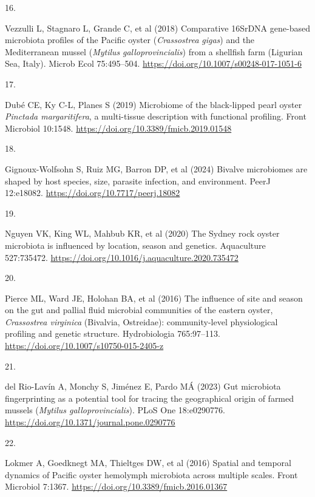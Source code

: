 \documentclass[
  12 pt,
]{article}
\newlength{\cslhangindent}
\newlength{\csllabelwidth}
\newenvironment{CSLReferences}[2] %
 {\begin{list}{}{%
  \setlength{\itemindent}{0pt}
  \setlength{\leftmargin}{0pt}
  \setlength{\parsep}{0pt}
  \ifodd #1
   \setlength{\leftmargin}{\cslhangindent}
   \setlength{\itemindent}{-1\cslhangindent}
  \fi
  \setlength{\itemsep}{#2\baselineskip}}}
 {\end{list}}
\newcommand{\CSLLeftMargin}[1]{\parbox[t]{\csllabelwidth}{\strut#1\strut}}
\newcommand{\CSLRightInline}[1]{\parbox[t]{\linewidth - \csllabelwidth}{\strut#1\strut}}
\begin{document}
\begin{CSLReferences}{0}{0}
\CSLLeftMargin{16. }%
\CSLRightInline{Vezzulli L, Stagnaro L, Grande C, et al (2018) Comparative {16SrDNA} gene-based microbiota profiles of the {Pacific} oyster ({{\emph{Crassostrea}}}{{\emph{ gigas}}}) and the {Mediterranean} mussel ({{\emph{Mytilus}}}{{\emph{ galloprovincialis}}}) from a shellfish farm ({Ligurian Sea}, {Italy}). Microb Ecol 75:495--504. \url{https://doi.org/10.1007/s00248-017-1051-6}}

\CSLLeftMargin{17. }%
\CSLRightInline{Dubé CE, Ky C-L, Planes S (2019) Microbiome of the black-lipped pearl oyster {{\emph{Pinctada margaritifera}}}, a multi-tissue description with functional profiling. Front Microbiol 10:1548. \url{https://doi.org/10.3389/fmicb.2019.01548}}

\CSLLeftMargin{18. }%
\CSLRightInline{Gignoux-Wolfsohn S, Ruiz MG, Barron DP, et al (2024) Bivalve microbiomes are shaped by host species, size, parasite infection, and environment. PeerJ 12:e18082. \url{https://doi.org/10.7717/peerj.18082}}

\CSLLeftMargin{19. }%
\CSLRightInline{Nguyen VK, King WL, Mahbub KR, et al (2020) The {Sydney} rock oyster microbiota is influenced by location, season and genetics. Aquaculture 527:735472. \url{https://doi.org/10.1016/j.aquaculture.2020.735472}}

\CSLLeftMargin{20. }%
\CSLRightInline{Pierce ML, Ward JE, Holohan BA, et al (2016) The influence of site and season on the gut and pallial fluid microbial communities of the eastern oyster, {{\emph{Crassostrea virginica}}} ({Bivalvia}, {Ostreidae}): community-level physiological profiling and genetic structure. Hydrobiologia 765:97--113. \url{https://doi.org/10.1007/s10750-015-2405-z}}

\CSLLeftMargin{21. }%
\CSLRightInline{del Rio-Lavín A, Monchy S, Jiménez E, Pardo MÁ (2023) Gut microbiota fingerprinting as a potential tool for tracing the geographical origin of farmed mussels ({{\emph{Mytilus galloprovincialis}}}). PLoS One 18:e0290776. \url{https://doi.org/10.1371/journal.pone.0290776}}

\CSLLeftMargin{22. }%
\CSLRightInline{Lokmer A, Goedknegt MA, Thieltges DW, et al (2016) Spatial and temporal dynamics of {Pacific} oyster hemolymph microbiota across multiple scales. Front Microbiol 7:1367. \url{https://doi.org/10.3389/fmicb.2016.01367}}


\end{CSLReferences}
\end{document}
